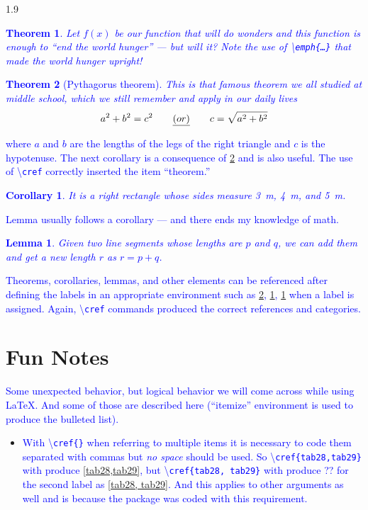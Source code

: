 \documentclass[phd]{ndsu-thesis-2022}
\newcommand\myspacing{1.9} %
\newtheorem{theorem}{Theorem}[section]
\newtheorem{corollary}{Corollary}[theorem]
\newtheorem{lemma}{Lemma}[corollary]
\newcommand\italk[1]{\textcolor{blue}{#1}}  %
\newcommand\cmd[1]{\textbackslash\texttt{#1}}  %
\begin{document}
\begin{spacing}{\myspacing}
\vspace{-0.5in}
\italk{
\begin{theorem}
Let \(f(x)\) be our function that will do wonders and this function is enough to \emph{``end the world hunger''} --- but will it? Note the use of \cmd{emph\{\ldots\}} that made the world hunger upright!
\end{theorem}
\begin{theorem}[Pythagorus theorem]
\label{pytha}
This is that famous theorem we all studied at middle school, which we still remember and apply in our daily lives 
\vspace{6ex} 
\[ a^2 + b^2 = c^2  \qquad \emph{(or)} \qquad c = \sqrt{a^2 + b^2} \] 
\end{theorem}
\vspace{-3ex} 
\noindent where $a$ and $b$ are the lengths of the legs of the right triangle and $c$ is the hypotenuse. 
The next corollary is a consequence of \cref{pytha} and is also useful. The use of \cmd{cref} correctly inserted the item ``theorem.''
\begin{corollary}
It is a right rectangle whose sides measure \SI{3}{m}, \SI{4}{m}, and \SI{5}{m}.
\label{coro}
\end{corollary}
Lemma usually follows a corollary --- and there ends my knowledge of math.
\begin{lemma}
Given two line segments whose lengths are $p$ and $q$, we can add them and get a new length $r$ as \(r=p+q\).
\label{lem}
\end{lemma}
Theorems, corollaries, lemmas, and other elements can be referenced after defining the labels in an appropriate environment such as \cref{pytha}, \cref{coro}, \cref{lem} when a label is assigned. Again, \cmd{cref} commands produced the correct references and categories. 
}

\section{Fun Notes}
\italk{Some unexpected behavior, but logical behavior we will come across while using \LaTeX. And some of those are described here (``itemize'' environment is used to produce the bulleted list).}

\begin{itemize}
\item
\italk{With \cmd{cref\{\}} when referring to multiple items it is necessary to code them separated with commas but \emph{no space} should be used. So \cmd{cref\{tab28,tab29\}} with produce} \cref{tab28,tab29}\italk{, but \cmd{cref\{tab28, tab29\}} with produce ?? for the second label as } \cref{tab28, tab29}\italk{. And this applies to other arguments as well and is because the package was coded with this requirement.}


\end{itemize}
\end{spacing}
\end{document}
